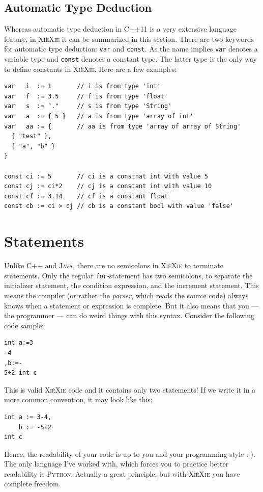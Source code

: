 \documentclass[a5paper]{report}
\def\xiexie{\textsc{Xi\`eXie}\xspace}
\def\cpp{\textsc{C++}\xspace}
\def\cppx{\textsc{C++11}\xspace}
\def\java{\textsc{Java}\xspace}
\def\python{\textsc{Python}\xspace}
\begin{document}
\subsection{Automatic Type Deduction}

Whereas automatic type deduction in \cppx is a very extensive language feature,
in \xiexie it can be summarized in this section.
There are two keywords for automatic type deduction: \texttt{var} and \texttt{const}. As the name implies
\texttt{var} denotes a variable type and \texttt{const} denotes a constant type. The latter type is the only way
to define constants in \xiexie. Here are a few examples:
\begin{lstlisting}
var   i  := 1       // i is from type 'int'
var   f  := 3.5     // f is from type 'float'
var   s  := "."     // s is from type 'String'
var   a  := { 5 }   // a is from type 'array of int'
var   aa := {       // aa is from type 'array of array of String'
  { "test" },
  { "a", "b" }
}

const ci := 5       // ci is a constnat int with value 5
const cj := ci*2    // cj is a constant int with value 10
const cf := 3.14    // cf is a constant float
const cb := ci > cj // cb is a constant bool with value 'false'
\end{lstlisting}



\section{Statements}

Unlike \cpp and \java, there are no semicolons in \xiexie to terminate statements.
Only the regular \texttt{for}-statement has two semicolons, to separate the initializer statement,
the condition expression, and the increment statement. This means the compiler
(or rather the \textit{parser}, which reads the source code) always knows when a statement or expression is complete.
But it also means that you --- the programmer --- can do weird things with this syntax. Consider the following code sample:
\begin{lstlisting}
int a:=3
-4
,b:=-
5+2 int c
\end{lstlisting}
This is valid \xiexie code and it contains only two statements!
If we write it in a more common convention, it may look like this:
\begin{lstlisting}
int a := 3-4,
    b := -5+2
int c
\end{lstlisting}
Hence, the readability of your code is up to you and your programming style :-). The only language I've worked with,
which forces you to practice better readability is \python.
Actually a great principle, but with \xiexie you have complete freedom.
\end{document}
